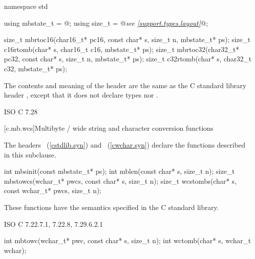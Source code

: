 %
%
%
%
%
%
%
%
\begin{codeblock}
namespace std {
  using mbstate_t = @\seebelow@;
  using size_t = @\textit{see \ref{support.types.layout}}@;

  size_t mbrtoc16(char16_t* pc16, const char* s, size_t n, mbstate_t* ps);
  size_t c16rtomb(char* s, char16_t c16, mbstate_t* ps);
  size_t mbrtoc32(char32_t* pc32, const char* s, size_t n, mbstate_t* ps);
  size_t c32rtomb(char* s, char32_t c32, mbstate_t* ps);
}
\end{codeblock}

\pnum
{}%
%
The contents and meaning of the header 
are the same as the C standard library header
, except that it does not declare types  nor
.

\xref ISO C 7.28

[c.mb.wcs]{Multibyte / wide string and character conversion functions}

\pnum
{}%
%
%
%
\begin{note}
The headers ~(\ref{cstdlib.syn})
and ~(\ref{cwchar.syn})
declare the functions described in this subclause.
\end{note}

%
%
%
%
\begin{itemdecl}
int mbsinit(const mbstate_t* ps);
int mblen(const char* s, size_t n);
size_t mbstowcs(wchar_t* pwcs, const char* s, size_t n);
size_t wcstombs(char* s, const wchar_t* pwcs, size_t n);
\end{itemdecl}

\begin{itemdescr}
\pnum
\effects
These functions have the semantics specified in the C standard library.
\end{itemdescr}

\xref ISO C 7.22.7.1, 7.22.8, 7.29.6.2.1

%
%
\begin{itemdecl}
int mbtowc(wchar_t* pwc, const char* s, size_t n);
int wctomb(char* s, wchar_t wchar);
\end{itemdecl}

